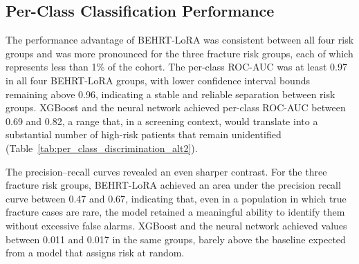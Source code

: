 \documentclass[12pt]{article}
\begin{document}
\subsection{Per-Class Classification Performance}

The performance advantage of BEHRT-LoRA was consistent between all four risk groups and was more pronounced for the three fracture risk groups, each of which represents less than 1\% of the cohort. The per-class ROC-AUC was at least 0.97 in all four BEHRT-LoRA groups, with lower confidence interval bounds remaining above 0.96, indicating a stable and reliable separation between risk groups. XGBoost and the neural network achieved per-class ROC-AUC between 0.69 and 0.82, a range that, in a screening context, would translate into a substantial number of high-risk patients that remain unidentified (Table~\ref{tab:per_class_discrimination_alt2}).

The precision--recall curves revealed an even sharper contrast. For the three fracture risk groups, BEHRT-LoRA achieved an area under the precision recall curve between 0.47 and 0.67, indicating that, even in a population in which true fracture cases are rare, the model retained a meaningful ability to identify them without excessive false alarms. XGBoost and the neural network achieved values between 0.011 and 0.017 in the same groups, barely above the baseline expected from a model that assigns risk at random.
\end{document}
